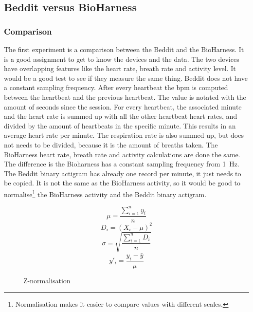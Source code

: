 	\subsection{Beddit versus BioHarness}
		\label{sec:bvsb}
		\subsubsection{Comparison}
			The first experiment is a comparison between the Beddit and the BioHarness. It is a good assignment to get to know the devices and the data. The two devices have overlapping features like the heart rate, breath rate and activity level. It would be a good test to see if they measure the same thing. 
			Beddit does not have a constant sampling frequency. After every heartbeat the bpm is computed between the heartbeat and the previous heartbeat. The value is notated with the amount of seconds since the session. For every heartbeat, the associated minute and the heart rate is summed up with all the other heartbeat heart rates, and divided by the amount of heartbeats in the specific minute. This results in an average heart rate per minute. The respiration rate is also summed up, but does not needs to be divided, because it is the amount of breaths taken.
			The BioHarness heart rate, breath rate and activity calculations are done the same. The difference is the Bioharness has a constant sampling frequency from \SI{1}{\hertz}. 
			The Beddit binary actigram has already one record per minute, it just needs to be copied. It is not the same as the BioHarness activity, so it would be good to normalise\footnote{Normalisation makes it easier to compare values with different scales.} the BioHarness activity and the Beddit binary actigram.
			\begin{figure}[h]
				\begin{equation*}
					\label{eq:normalisation}
					\mu = \frac{ \sum\limits_{i=1}^n y_i } { n }
				\end{equation*}
				\begin{equation*}
					D_i = (X_i - \mu)^2
				\end{equation*}
				\begin{equation*}
					\sigma = \sqrt{ \frac{ \sum\limits_{i=1}^n D_i } { n } }
				\end{equation*}
				\begin{equation*}
					y'_i = \frac{ y_i - \bar{y} } { \mu }
				\end{equation*}
				\caption{Z-normalisation \cite{statistics}}
			\end{figure}

